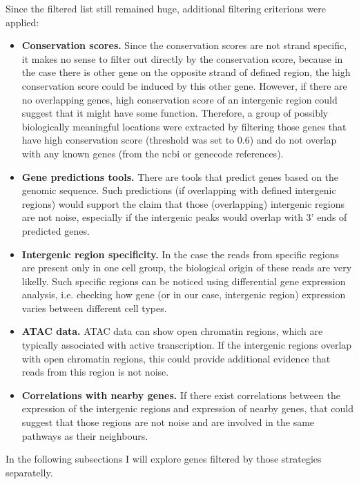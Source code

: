 Since the filtered list still remained huge, additional filtering criterions were applied:
\begin{itemize}
  \item \textbf{Conservation scores.} Since the conservation scores are not strand specific,
  it makes no sense to filter out directly by the conservation score, because in the case there is other gene on the opposite strand
  of defined region, the high conservation score could be induced by this other gene.
  However, if there are no overlapping genes, high conservation score of an intergenic region could suggest that it might have some function.
  Therefore, a group of possibly biologically meaningful locations were extracted by filtering those genes that have high conservation score
  (threshold was set to 0.6) and do not overlap with any known genes (from the ncbi or genecode references).
  \item \textbf{Gene predictions tools.} There are tools that predict genes based on the genomic sequence.
  Such predictions (if overlapping with defined intergenic regions) would support the claim that
  those (overlapping) intergenic regions are not noise, especially if the intergenic peaks would overlap with 3' ends of predicted genes.
  \item \textbf{Intergenic region specificity.} In the case the reads from specific regions are present only in one cell group,
  the biological origin of these reads are very likelly.
  Such specific regions can be noticed using differential gene expression analysis,
  i.e. checking how gene (or in our case, intergenic region) expression varies between different cell types.
  \item \textbf{ATAC data.} ATAC data can show open chromatin regions, which are typically associated with active transcription.
  If the intergenic regions overlap with open chromatin regions, this could provide additional evidence that reads from this region is not noise.
  \item \textbf{Correlations with nearby genes.} If there exist correlations between the expression of the intergenic regions
  and expression of nearby genes, that could suggest that those regions are not noise and are involved in the same pathways as their neighbours.
\end{itemize}

In the following subsections I will explore genes filtered by those strategies separatelly.

